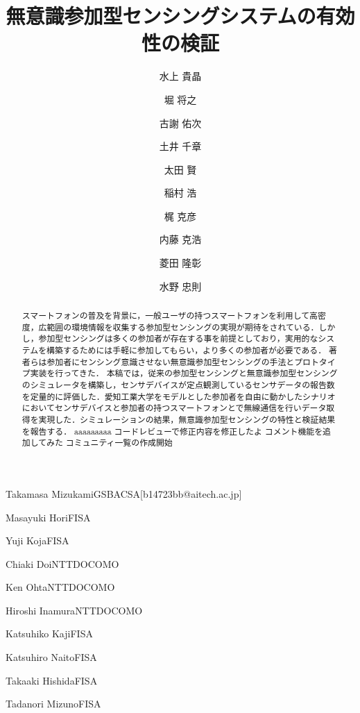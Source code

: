 \documentclass[submit,techrep]{ipsj}
\begin{document}
\title{無意識参加型センシングシステムの有効性の検証}






\author{水上 貴晶}{Takamasa Mizukami}{GSBACSA}[b14723bb@aitech.ac.jp]
\author{堀 将之}{Masayuki Hori}{FISA}%
\author{古謝 佑次}{Yuji Koja}{FISA}%
\author{土井 千章}{Chiaki Doi}{NTTDOCOMO}%
\author{太田 賢}{Ken Ohta}{NTTDOCOMO}%
\author{稲村 浩}{Hiroshi Inamura}{NTTDOCOMO}%
\author{梶 克彦}{Katsuhiko Kaji}{FISA}%
\author{内藤 克浩}{Katsuhiro Naito}{FISA}%
\author{菱田 隆彰}{Takaaki Hishida}{FISA}%
\author{水野 忠則}{Tadanori Mizuno}{FISA}%


\begin{abstract}
スマートフォンの普及を背景に，一般ユーザの持つスマートフォンを利用して高密度，広範囲の環境情報を収集する参加型センシングの実現が期待をされている．しかし，参加型センシングは多くの参加者が存在する事を前提としており，実用的なシステムを構築するためには手軽に参加してもらい，より多くの参加者が必要である．
著者らは参加者にセンシング意識させない無意識参加型センシングの手法とプロトタイプ実装を行ってきた．
本稿では，従来の参加型センシングと無意識参加型センシングのシミュレータを構築し，センサデバイスが定点観測しているセンサデータの報告数を定量的に評価した．愛知工業大学をモデルとした参加者を自由に動かしたシナリオにおいてセンサデバイスと参加者の持つスマートフォンとで無線通信を行いデータ取得を実現した．シミュレーションの結果，無意識参加型センシングの特性と検証結果を報告する．
aaaaaaaaa
コードレビューで修正内容を修正したよ
コメント機能を追加してみた
コミュニティ一覧の作成開始
\end{abstract}
\end{document}
